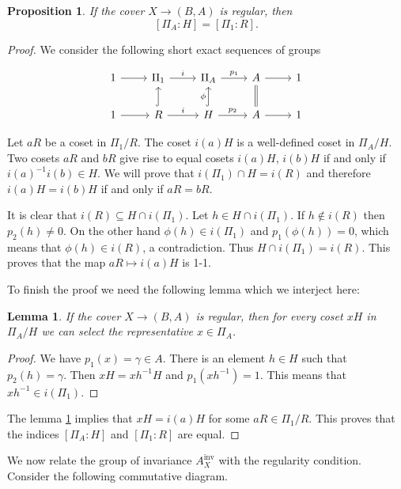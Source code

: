 \documentclass[10pt]{amsart}
\newtheorem{lemma}[theorem]{Lemma}
\newtheorem{proposition}[theorem]{Proposition}
\theoremstyle{definition}
\begin{document}
\begin{proposition}
\label{prop:equalityofindices}
If the cover $X \to (B,A)$ is regular, then \[[\Pi_A:H] = [\Pi_1:R].\]
\end{proposition}

\begin{proof}
    

We consider the following short exact sequences of groups

\[
\begin{tikzcd}[column sep=normal]
1 \ar[r] & \Pi_1 \ar[r,"i"] & \Pi_A \ar[r,"p_1"] & A \ar[r] & 1 \\
1 \ar[r] & R \ar[r,"i"] \ar[hookrightarrow,u] & H \ar[r,"p_2"] \ar[hookrightarrow,u,"\phi"] & A \ar[r] \ar[u, equal] & 1
\end{tikzcd}
\]


Let $aR$ be a coset in $ \Pi_1/R$. The coset $i(a)H$ is a well-defined coset in $\Pi_A/H$. Two cosets $aR$ and $bR$ give rise to equal cosets $i(a)H$, $i(b)H$ if and only if $i(a)^{-1}i(b) \in H$. We will prove that $i(\Pi_1) \cap H=i(R)$ and therefore $i(a)H=i(b)H$ if and only if $aR=bR$.

It is clear that $i(R) \subseteq H \cap i(\Pi_1)$. Let $h\in H \cap i(\Pi_1)$. If $h \not \in i(R)$ then $p_2(h)\neq 0$. On the other hand $\phi(h) \in  i(\Pi_1)$ and $p_1(\phi(h))=0$, which means that $\phi(h) \in i(R)$, a contradiction. Thus $H \cap i(\Pi_1)=i(R)$.
This proves that the map $aR \mapsto i(a)H$ is 1-1. 

To finish the proof we need the following lemma which we interject here:

\begin{lemma}
  \label{lemma:coset-map}
  If the cover $X \rightarrow (B,A)$ is regular, then for every coset $xH$  in $\Pi_A/H$ we can select the representative $x \in \Pi_A$.
\end{lemma}
\begin{proof}
We have $p_1(x)=\gamma \in A$. There is an element $h \in H$ such that $p_2(h)=\gamma$. Then $xH= x h^{-1}H$ and $p_1(xh^{-1})=1$. This means that $xh^{-1} \in i(\Pi_1)$.
\end{proof}

The lemma \ref{lemma:coset-map} implies that $xH=i(a)H$ for some $aR \in \Pi_1/R$. This proves that the indices $[\Pi_A:H]$ and $[\Pi_1:R]$ are equal.
\end{proof}

We now relate the group of invariance $A_X^{\mathrm{inv}}$ with the regularity condition. Consider the following commutative diagram.
\end{document}
